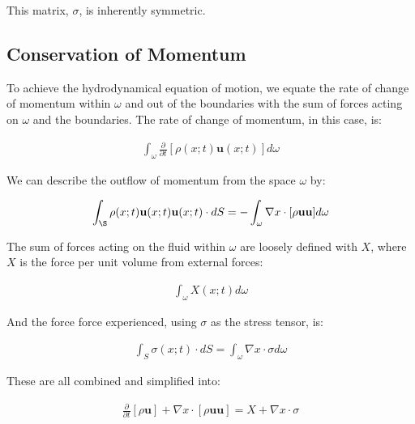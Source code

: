 This matrix, $\sigma$, is inherently symmetric. 



\subsection{Conservation of Momentum}

To achieve the hydrodynamical equation of motion, we equate the rate of change of momentum within $\omega$ and out of the boundaries with the sum of forces acting on $\omega$ and the boundaries. The rate of change of momentum, in this case, is:

\begin{equation} \label{phenom1}
\begin{split}
\int_\omega\frac{\partial}{\partial t}[\rho(x;t)\mathbf{u}(x;t)]d\omega
\end{split}
\end{equation}

We can describe the outflow of momentum from the space $\omega$ by:

\begin{equation} \label{phenom1}
\begin{split}
\int_\S \rho(x;t)\mathbf{u}(x;t)\mathbf{u}(x;t) \cdot dS = -\int_\omega \nabla x \cdot [\rho \mathbf{u}\mathbf{u}]d\omega
\end{split}
\end{equation}

The sum of forces acting on the fluid within $\omega$ are loosely defined with $X$, where $X$ is the force per unit volume from external forces:

\begin{equation} \label{phenom1}
\begin{split}
\int_\omega X(x;t)d\omega
\end{split}
\end{equation}

And the force force experienced, using $\sigma$ as the stress tensor, is:

\begin{equation} \label{phenom1}
\begin{split}
\int_S \sigma(x;t)\cdot dS = \int_\omega \nabla x \cdot \sigma d\omega
\end{split}
\end{equation}

These are all combined and simplified into: 

\begin{equation} \label{phenom1}
\begin{split}
\frac{\partial}{\partial t}[\rho \mathbf{u}] + \nabla x \cdot [\rho\mathbf{u}\mathbf{u}] = X + \nabla x \cdot \sigma
\end{split}
\end{equation}


